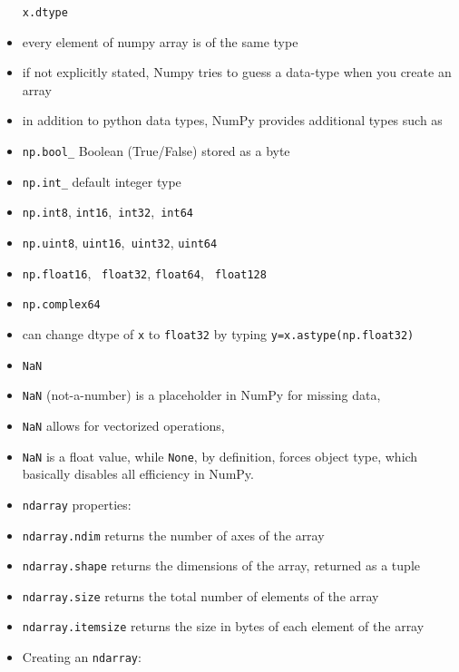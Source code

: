 \documentclass[onecolumn]{IEEEtran} %
\begin{document}
\begin{itemize}
        \verb|x.dtype|
        \item every element of numpy array is of the same type
        \item if not explicitly stated, Numpy tries to guess a data-type when you create an array
        \item in addition to python data types, NumPy provides additional types such as
        \bi
            \item \verb|np.bool_| Boolean (True/False) stored as a byte
            \item \verb|np.int_| default integer type
            \item \verb|np.int8|, \verb|int16|,\verb| int32|,\verb| int64|
            \item \verb|np.uint8|,  \verb|uint16|,\verb| uint32|, \verb|uint64|
            \item \verb|np.float16|, \verb| float32|, \verb|float64|, \verb| float128|
            \item \verb|np.complex64|
        \ei
        \item can change dtype of \verb|x| to \verb|float32| by typing \newline \verb|y=x.astype(np.float32)|
    \ei
    \item \verb|NaN|
    \bi
        \item \verb|NaN| (not-a-number) is a placeholder in NumPy for missing data,
        \item \verb|NaN| allows for vectorized operations,
        \item \verb|NaN| is a float value, while \verb|None|, by definition, forces object type, which basically disables all efficiency in NumPy.
    \ei
    \item \verb|ndarray| properties:
    \bi
        \item \verb|ndarray.ndim| \newline returns the number of axes of the array
        \item \verb|ndarray.shape| \newline returns the dimensions of the array, returned as a tuple
        \item \verb|ndarray.size| \newline returns the total number of elements of the array
        \item \verb|ndarray.itemsize| \newline returns the size in bytes of each element of the array
     \ei
    \item Creating an \verb|ndarray|:

\end{itemize}
\end{document}
